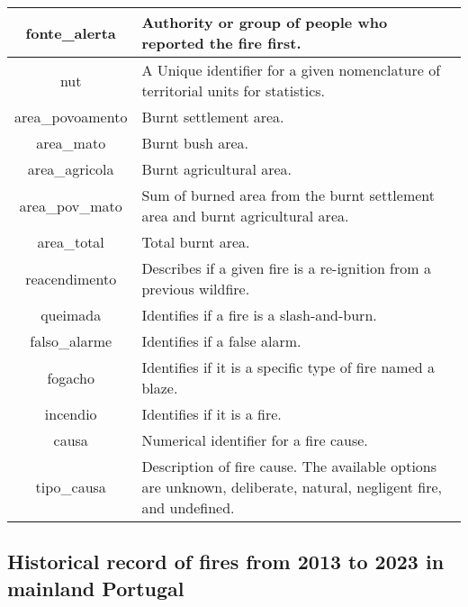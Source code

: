 \begin{table}[h!]
\begin{tabular}{|c|p{7.5cm}|}
\hline
fonte\_alerta & Authority or group of people who reported the fire first. \\
\hline
nut & A Unique identifier for a given nomenclature of territorial units for statistics. \\
\hline
area\_povoamento & Burnt settlement area. \\
\hline
area\_mato & Burnt bush area.  \\
\hline
area\_agricola & Burnt agricultural area. \\
\hline
area\_pov\_mato & Sum of burned area from the burnt settlement area and burnt agricultural area.\\
\hline
area\_total & Total burnt area. \\
\hline
reacendimento & Describes if a given fire is a re-ignition from a previous wildfire. \\
\hline
queimada & Identifies if a fire is a slash-and-burn. \\
\hline
falso\_alarme & Identifies if a false alarm. \\
\hline
fogacho & Identifies if it is a specific type of fire named a blaze. \\
\hline
incendio & Identifies if it is a fire. \\
\hline
causa & Numerical identifier for a fire cause. \\
\hline
tipo\_causa & Description of fire cause. The available options are unknown, deliberate, natural, negligent fire, and undefined. \\
\hline
\end{tabular}
\end{table}


\subsection{Historical record of fires from 2013 to 2023 in mainland Portugal \cite{icnf2024}}

